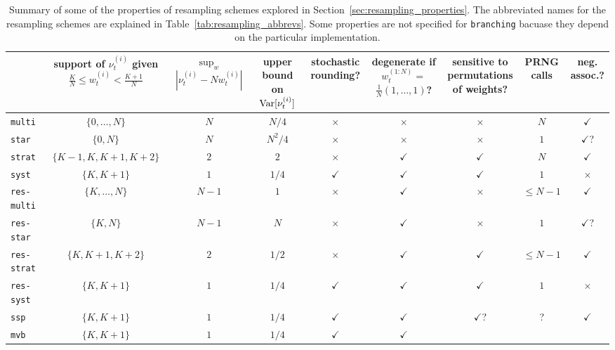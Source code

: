 \begin{landscape}
\begin{table}[ht]
\centering
\begin{tabular}{ l | c c c c c c c c }
\hline\hline
& \thead{support of $\nu_t^{(i)}$ given
            \\ $ \frac{K}{N} \leq w_t^{(i)} < \frac{K+1}{N}$} 
        & \thead{$\sup_w$\\ $|\nu_t^{(i)} - Nw_t^{(i)}|$}
        & \thead{upper\\ bound on \\ $\operatorname{Var}[\nu_t^{(i)}]$}
        & \thead{stochastic\\ rounding?}       
        & \thead{degenerate if\\ $w_t^{(1:N)} =$\\ $\frac{1}{N}(1,\dots,1)$?} 
        & \thead{sensitive to\\ permutations\\ of weights?} 
        & \thead{PRNG\\ calls}
        & \thead{neg.\\ assoc.?} \\
\hline
\texttt{multi} & $\{0,\dots,N\}$ & $N$ & $N/4$ & $\times$ & $\times$ 
        & $\times$ & $N$ & $\checkmark$ \\
\texttt{star} & $\{0, N\}$ & $N$ & $N^2/4$ & $\times$ & $\times$ 
        & $\times$ & $1$ & $\checkmark$? \\
\texttt{strat} & $\{K-1, K, K+1, K+2\}$ & $2$ & $2$ & $\times$ & $\checkmark$ 
        & $\checkmark$ & $N$ & $\checkmark$ \\
\texttt{syst} & $\{K, K+1\}$ & $1$ & $1/4$ & $\checkmark$ & $\checkmark$ 
        & $\checkmark$ & $1$ & $\times$ \\
\texttt{res-multi} & $\{K,\dots,N\}$ & $N-1$ & $1$ & $\times$ & $\checkmark$ 
        & $\times$ & $\leq N-1$ & $\checkmark$ \\
\texttt{res-star} & $\{K, N\}$ & $N-1$ & $N$ & $\times$ & $\checkmark$ 
        & $\times$ & $1$ & $\checkmark$? \\
\texttt{res-strat} & $\{K, K+1, K+2\}$ & $2$ & $1/2$ & $\times$ & $\checkmark$ 
        & $\checkmark$ & $\leq N-1$ & $\checkmark$ \\
\texttt{res-syst} & $\{K, K+1\}$ & $1$ & $1/4$ & $\checkmark$ & $\checkmark$ 
        & $\checkmark$ & $1$ & $\times$ \\
\texttt{ssp} & $\{K, K+1\}$ & $1$ & $1/4$ & $\checkmark$ & $\checkmark$ 
        & $\checkmark$? & ? & $\checkmark$ \\
\texttt{mvb} & $\{K, K+1\}$ & $1$ & $1/4$ & $\checkmark$ & $\checkmark$ 
        & & & \\
\hline\hline
\end{tabular}
\caption[Properties of resampling schemes]{Summary of some of the properties of resampling schemes explored in Section~\ref{sec:resampling_properties}. The abbreviated names for the resampling schemes are explained in Table~\ref{tab:resampling_abbrevs}. Some properties are not specified for \texttt{branching} bacuase they depend on the particular implementation.}
\label{tab:resampling_properties}
\end{table} 
\end{landscape}
 
